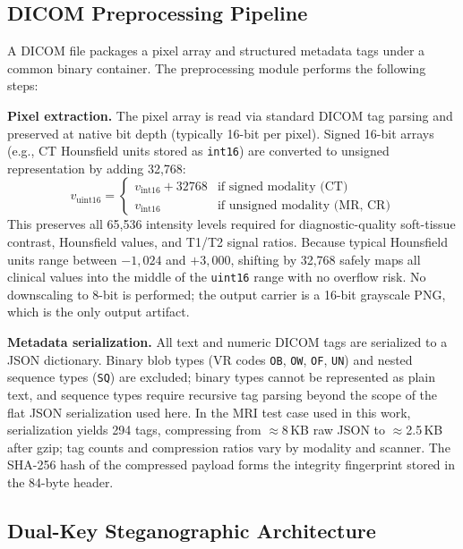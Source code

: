 \documentclass{jstarticle}
\begin{document}
\subsection{DICOM Preprocessing Pipeline}

A DICOM file packages a pixel array and structured metadata tags under a common binary container.
The preprocessing module performs the following steps:

\textbf{Pixel extraction.}
The pixel array is read via standard DICOM tag parsing and preserved at native bit depth (typically 16-bit per pixel).
Signed 16-bit arrays (e.g., CT Hounsfield units stored as \texttt{int16}) are converted to unsigned representation by adding 32,768:
\begin{equation}
v_{\text{uint16}} =
\begin{cases}
v_{\text{int16}} + 32768 & \text{if signed modality (CT)} \\
v_{\text{int16}}         & \text{if unsigned modality (MR, CR)}
\end{cases}
\label{eq:uint16}
\end{equation}
This preserves all 65,536 intensity levels required for diagnostic-quality soft-tissue contrast, Hounsfield values, and T1/T2 signal ratios.
Because typical Hounsfield units range between $-1{,}024$ and $+3{,}000$, shifting by 32,768 safely maps all clinical values into the middle of the \texttt{uint16} range with no overflow risk.
No downscaling to 8-bit is performed; the output carrier is a 16-bit grayscale PNG, which is the only output artifact.

\textbf{Metadata serialization.}
All text and numeric DICOM tags are serialized to a JSON dictionary.
Binary blob types (VR codes \texttt{OB}, \texttt{OW}, \texttt{OF}, \texttt{UN}) and nested sequence types (\texttt{SQ}) are excluded; binary types cannot be represented as plain text, and sequence types require recursive tag parsing beyond the scope of the flat JSON serialization used here.
In the MRI test case used in this work, serialization yields 294 tags, compressing from $\approx$8\,KB raw JSON to $\approx$2.5\,KB after gzip; tag counts and compression ratios vary by modality and scanner.
The SHA-256 hash of the compressed payload forms the integrity fingerprint stored in the 84-byte header.

\subsection{Dual-Key Steganographic Architecture}
\end{document}
